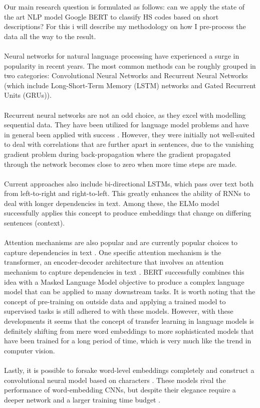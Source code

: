 Our main research question is formulated as follows: can we apply the state of the art NLP model Google BERT to classify HS codes based on short descriptions? For this i will describe my methodology on how I pre-process the data all the way to the result.\\
\\
Neural networks for natural language processing have experienced a surge in popularity in recent years. The most common methods can be roughly grouped in two categories: Convolutional Neural Networks and Recurrent Neural Networks (which include Long-Short-Term Memory (LSTM) networks and Gated Recurrent Units (GRUs)).\\
\\
Recurrent neural networks are not an odd choice, as they excel with modelling sequential data. They have been utilized for language model problems and have in general been applied with success \cite{Mikolov2010a, Chung2014, Lai2015, Howard2018, Xu}. However, they were initially not well-suited to deal with correlations that are further apart in sentences, due to the vanishing gradient problem during back-propagation where the gradient propagated through the network becomes close to zero when more time steps are made.\\
\\
Current approaches also include bi-directional LSTMs, which pass over text both from left-to-right and right-to-left. This greatly enhances the ability of RNNs to deal with longer dependencies in text. Among these, the ELMo model \cite{Peters2018} successfully applies this concept to produce embeddings that change on differing sentences (context).\\
\\
Attention mechanisms are also popular and are currently popular choices to capture dependencies in text \cite{Lin2017, Openai}. One specific attention mechanism is the transformer, an encoder-decoder architecture that involves an attention mechanism to capture dependencies in text \cite{Vaswani2017}. BERT \cite{Devlin2018} successfully combines this idea with a Masked Language Model objective to produce a complex language model that can be applied to many downstream tasks. It is worth noting that the concept of pre-training on outside data and applying a trained model to supervised tasks is still adhered to with these models. However, with these developments it seems that the concept of transfer learning in language models is definitely shifting from mere word embeddings to more sophisticated models that have been trained for a long period of time, which is very much like the trend in computer vision.\\
\\
Lastly, it is possible to forsake word-level embeddings completely and construct a convolutional neural model based on characters \cite{Zhang2015, Conneau2017, Shrestha}. These models rival the performance of word-embedding CNNs, but despite their elegance require a deeper network and a larger training time budget \cite{Le2017, Conneau2017, Adams2018}.

